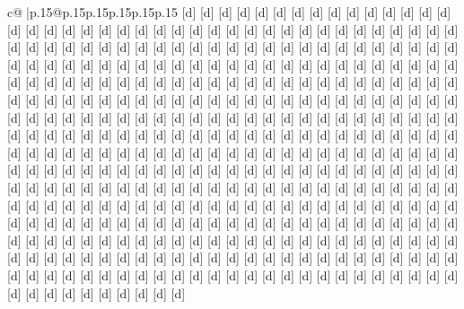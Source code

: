 \documentclass{article}
\begin{document}
{\begin{supertabular}{c@{$\;$}|p{.15\linewidth}@{}p{.15\linewidth}p{.15\linewidth}p{.15\linewidth}p{.15\linewidth}p{.15\linewidth}}
{{{{[}d{]} {[}d{]} {[}d{]} {[}d{]} {[}d{]} {[}d{]} {[}d{]} {[}d{]} {[}d{]} {[}d{]} {[}d{]} {[}d{]} {[}d{]} {[}d{]} {[}d{]} {[}d{]} {[}d{]} {[}d{]} {[}d{]} {[}d{]} {[}d{]} {[}d{]} {[}d{]} {[}d{]} {[}d{]} {[}d{]} {[}d{]} {[}d{]} {[}d{]} {[}d{]} {[}d{]} {[}d{]} {[}d{]} {[}d{]} {[}d{]} {[}d{]} {[}d{]} {[}d{]} {[}d{]} {[}d{]} {[}d{]} {[}d{]} {[}d{]} {[}d{]} {[}d{]} {[}d{]} {[}d{]} {[}d{]} {[}d{]} {[}d{]} {[}d{]} {[}d{]} {[}d{]} {[}d{]} {[}d{]} {[}d{]} {[}d{]} {[}d{]} {[}d{]} {[}d{]} {[}d{]} {[}d{]} {[}d{]} {[}d{]} {[}d{]} {[}d{]} {[}d{]} {[}d{]} {[}d{]} {[}d{]} {[}d{]} {[}d{]} {[}d{]} {[}d{]} {[}d{]} {[}d{]} {[}d{]} {[}d{]} {[}d{]} {[}d{]} {[}d{]} {[}d{]} {[}d{]} {[}d{]} {[}d{]} {[}d{]} {[}d{]} {[}d{]} {[}d{]} {[}d{]} {[}d{]} {[}d{]} {[}d{]} {[}d{]} {[}d{]} {[}d{]} {[}d{]} {[}d{]} {[}d{]} {[}d{]} {[}d{]} {[}d{]} {[}d{]} {[}d{]} {[}d{]} {[}d{]} {[}d{]} {[}d{]} {[}d{]} {[}d{]} {[}d{]} {[}d{]} {[}d{]} {[}d{]} {[}d{]} {[}d{]} {[}d{]} {[}d{]} {[}d{]} {[}d{]} {[}d{]} {[}d{]} {[}d{]} {[}d{]} {[}d{]} {[}d{]} {[}d{]} {[}d{]} {[}d{]} {[}d{]} {[}d{]} {[}d{]} {[}d{]} {[}d{]} {[}d{]} {[}d{]} {[}d{]} {[}d{]} {[}d{]} {[}d{]} {[}d{]} {[}d{]} {[}d{]} {[}d{]} {[}d{]} {[}d{]} {[}d{]} {[}d{]} {[}d{]} {[}d{]} {[}d{]} {[}d{]} {[}d{]} {[}d{]} {[}d{]} {[}d{]} {[}d{]} {[}d{]} {[}d{]} {[}d{]} {[}d{]} {[}d{]} {[}d{]} {[}d{]} {[}d{]} {[}d{]} {[}d{]} {[}d{]} {[}d{]} {[}d{]} {[}d{]} {[}d{]} {[}d{]} {[}d{]} {[}d{]} {[}d{]} {[}d{]} {[}d{]} {[}d{]} {[}d{]} {[}d{]} {[}d{]} {[}d{]} {[}d{]} {[}d{]} {[}d{]} {[}d{]} {[}d{]} {[}d{]} {[}d{]} {[}d{]} {[}d{]} {[}d{]} {[}d{]} {[}d{]} {[}d{]} {[}d{]} {[}d{]} {[}d{]} {[}d{]} {[}d{]} {[}d{]} {[}d{]} {[}d{]} {[}d{]} {[}d{]} {[}d{]} {[}d{]} {[}d{]} {[}d{]} {[}d{]} {[}d{]} {[}d{]} {[}d{]} {[}d{]} {[}d{]} {[}d{]} {[}d{]} {[}d{]} {[}d{]} {[}d{]} {[}d{]} {[}d{]} {[}d{]} {[}d{]} {[}d{]} {[}d{]} {[}d{]} {[}d{]} {[}d{]} {[}d{]} {[}d{]} {[}d{]} {[}d{]} {[}d{]} {[}d{]} {[}d{]} {[}d{]} {[}d{]} {[}d{]} {[}d{]} {[}d{]} {[}d{]} {[}d{]} {[}d{]} {[}d{]} {[}d{]} {[}d{]} {[}d{]} {[}d{]} {[}d{]} {[}d{]} {[}d{]} {[}d{]} {[}d{]} {[}d{]} {[}d{]} {[}d{]} {[}d{]} {[}d{]} {[}d{]} {[}d{]} {[}d{]} {[}d{]} {[}d{]} {[}d{]} {[}d{]} {[}d{]} {[}d{]} {[}d{]} {[}d{]} {[}d{]} {[}d{]} {[}d{]} {[}d{]} {[}d{]} {[}d{]} {[}d{]} {[}d{]} {[}d{]} {[}d{]} {[}d{]} {[}d{]} {[}d{]} {[}d{]} {[}d{]} {[}d{]} {[}d{]} {[}d{]} {[}d{]} {[}d{]} {[}d{]} {[}d{]} {[}d{]} {[}d{]} {[}d{]} {[}d{]} {[}d{]} {[}d{]} {[}d{]} {[}d{]} {[}d{]} {[}d{]} {[}d{]} {[}d{]} {[}d{]} {[}d{]} {[}d{]} {[}d{]} {[}d{]} {[}d{]} {[}d{]} {[}d{]} {[}d{]} {[}d{]} {[}d{]} {[}d{]} {[}d{]} {[}d{]} {[}d{]} {[}d{]} {[}d{]} {[}d{]} {[}d{]} {[}d{]} {[}d{]} {[}d{]} {[}d{]} {[}d{]} {[}d{]} {[}d{]} {[}d{]} {[}d{]} {[}d{]} {[}d{]} {[}d{]} {[}d{]} {[}d{]} {[}d{]} {[}d{]} {[}d{]} {[}d{]} {[}d{]} {[}d{]} {[}d{]} {[}d{]} {[}d{]} {[}d{]} {[}d{]} {[}d{]} {[}d{]} {[}d{]} {[}d{]} {[}d{]} {[}d{]} {[}d{]} {[}d{]} {[}d{]} {[}d{]} {[}d{]} {[}d{]} {[}d{]} {[}d{]} {[}d{]} {[}d{]} {[}d{]} {[}d{]} {[}d{]} {[}d{]} {[}d{]} {[}d{]} {[}d{]} {[}d{]} {[}d{]} {[}d{]} {[}d{]} {[}d{]} {[}d{]} {[}d{]} {[}d{]} {[}d{]} {[}d{]} {[}d{]} {[}d{]} {[}d{]} {[}d{]} {[}d{]} {[}d{]} {[}d{]} {[}d{]} {[}d{]} {[}d{]} {[}d{]} {[}d{]} {[}d{]} {[}d{]} {[}d{]} {[}d{]} {[}d{]} {[}d{]} }}}
\end{supertabular}}
\end{document}
